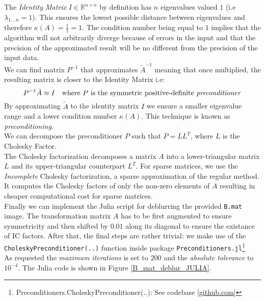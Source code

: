 \documentclass[unicode,11pt,a4paper,oneside,numbers=endperiod,openany]{scrartcl}
\begin{document}
The \textit{Identity Matrix} $I\in \mathds{R}^{n\times n}$ by definition has $n$ eigenvalues valued $1$ (i.e $\lambda_{1,..n} = 1$). This ensures the lowest possible distance between eigenvalues and therefore $\kappa(A) = \frac{1}{1} = 1$. The condition number being equal to $1$ implies that the algorithm will not arbitrarily diverge because of errors in the input and that the precision of the approximated result will be no different from the precision of the input data.\\
\label{preconditioning_par}
We can find matrix $P^{-1}$ that approximates $\tilde{A}^{-1}$ meaning that once multiplied, the resulting matrix is closer to the Identity Matrix i.e:
$$
P^{-1}\tilde{A} \approx I \quad \text{where $P$ is the symmetric positive-definite \textit{preconditioner}}
$$ 
By approximating $\tilde{A}$ to the identity matrix $I$ we ensure a smaller eigenvalue range and a lower condition number $\kappa(A)$. This technique is known as \textit{preconditioning}.\\
We can decompose the preconditioner $P$ such that $P= LL^T$, where $L$ is the Cholesky Factor.\\

The Cholesky factorization decomposes a matrix $A$ into a lower-triangular matrix $L$ and its upper-triangular counterpart $L^T$. For sparse matrices, we use the \textit{Incomplete} Cholesky factorization, a sparse approximation of the regular method. It computes the Cholesky factors of only the non-zero elements of $A$ resulting in cheaper computational cost for sparse matrices.\\


Finally we can implement the Julia script for deblurring the provided \verb|B.mat| image. The transformation matrix $A$ has to be first augmented to ensure symmetricity and then shifted by $0.01$ along its diagonal to ensure the existance of IC factors. After that, the final steps are rather trivial: we make use of the \verb|CholeskyPreconditioner(..)| function inside package \verb|Preconditioners.jl|\footnote{Preconditioners.CholeskyPreconditioner(..): See codebase [\href{https://github.com/JuliaLinearAlgebra/Preconditioners.jl}{github.com}]}\\
As requested the \textit{maximum iterations} is set to $200$ and the \textit{absolute tolerance} to $10^{-4}$. The Julia code is shown in Figure \ref{B_mat_deblur_JULIA}.\\
\end{document}
